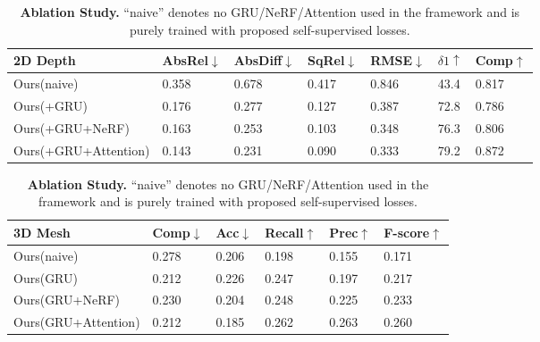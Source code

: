 \begin{table}[]
\setlength\tabcolsep{1pt}
\footnotesize
\begin{tabular}{lllllll}
\hline
\textbf{2D Depth}    & AbsRel$\downarrow$ & AbsDiff$\downarrow$ & SqRel$\downarrow$ & RMSE$\downarrow$  & $\delta1\uparrow$  & Comp$\uparrow$  \\ \hline
Ours(naive)  &0.358    & 0.678    & 0.417  & 0.846 & 43.4 & 0.817 \\
Ours(+GRU) & 0.176    & 0.277    & 0.127  & 0.387 & 72.8 & 0.786 \\
Ours(+GRU+NeRF)    &0.163    & 0.253    & 0.103  & 0.348 & 76.3 & 0.806 \\
Ours(+GRU+Attention) &0.143    & 0.231    & 0.090  & 0.333 & 79.2 & 0.872 \\ \hline
\end{tabular}
\setlength\tabcolsep{4.5pt}
\begin{tabular}{llllll}
\textbf{3D Mesh}     & Comp$\downarrow$  & Acc$\downarrow$   & Recall$\uparrow$ & Prec$\uparrow$  & F-score$\uparrow$ \\ \hline
Ours(naive)          & 0.278 & 0.206 & 0.198  & 0.155 & 0.171    \\
Ours(GRU)          & 0.212 & 0.226 & 0.247  & 0.197 & 0.217    \\
Ours(GRU+NeRF)          & 0.230 & 0.204 & 0.248  & 0.225 & 0.233    \\
Ours(GRU+Attention)     & 0.212 & 0.185 & 0.262  & 0.263 & 0.260    \\ \hline
\end{tabular}
\vspace{-3mm}
\caption{\textbf{Ablation Study.} ``naive'' denotes no
GRU/NeRF/Attention used in the framework and is purely trained with proposed self-supervised losses.
}
\label{table:scannet_ablation}
\vspace{-7mm}
\end{table}



